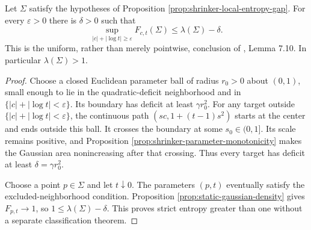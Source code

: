 \begin{theorem}\label{thm:shrinker-global-entropy-gap}
Let $\Sigma$ satisfy the hypotheses of Proposition \ref{prop:shrinker-local-entropy-gap}. For every $\varepsilon>0$ there is $\delta>0$ such that
\[
 \sup_{|c|+|\log t|\geq\varepsilon}F_{c,t}(\Sigma)
 \leq\lambda(\Sigma)-\delta.
\]
This is the uniform, rather than merely pointwise, conclusion of \cite{CM12}, Lemma 7.10. In particular $\lambda(\Sigma)>1$.
\end{theorem}
\begin{proof}
Choose a closed Euclidean parameter ball of radius $r_0>0$ about $(0,1)$, small enough to lie in the quadratic-deficit neighborhood and in $\{|c|+|\log t|<\varepsilon\}$. Its boundary has deficit at least $\gamma r_0^2$. For any target outside $\{|c|+|\log t|<\varepsilon\}$, the continuous path $(sc,1+(t-1)s^2)$ starts at the center and ends outside this ball. It crosses the boundary at some $s_0\in(0,1]$. Its scale remains positive, and Proposition \ref{prop:shrinker-parameter-monotonicity} makes the Gaussian area nonincreasing after that crossing. Thus every target has deficit at least $\delta=\gamma r_0^2$.

Choose a point $p\in\Sigma$ and let $t\downarrow0$. The parameters $(p,t)$ eventually satisfy the excluded-neighborhood condition. Proposition \ref{prop:static-gaussian-density} gives $F_{p,t}\to1$, so $1\leq\lambda(\Sigma)-\delta$. This proves strict entropy greater than one without a separate classification theorem.
\end{proof}
